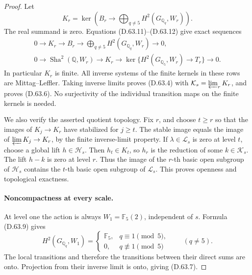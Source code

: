 \begin{proof}
Let
\[
 K_r=\ker\left(B_r\longrightarrow
                      \bigoplus_{q\ne5}H^2(G_{\mathbb Q_q},W_r)\right).
\]
The real summand is zero. Equations (D.63.11)--(D.63.12)
give exact sequences
\[
 \begin{gathered}
 0\longrightarrow K_r\longrightarrow B_r
   \longrightarrow\bigoplus_{q\ne5}H^2(G_{\mathbb Q_q},W_r)
   \longrightarrow0,\\
 0\longrightarrow\operatorname{Sha}^2(\mathbb Q,W_r)
   \longrightarrow K_r
   \longrightarrow
       \ker\{H^2(G_{\mathbb Q_5},W_r)\longrightarrow T_r\}
   \longrightarrow0.
 \end{gathered}                                          \tag{D.63.13}
\]
In particular \(K_r\) is finite. All inverse systems
of the finite kernels in these rows are Mittag--Leffler.
Taking inverse limits proves (D.63.4) with
\(\mathcal K_s=\varprojlim_rK_r\), and proves (D.63.6).
No surjectivity of the individual transition maps on
the finite kernels is needed.

We also verify the asserted quotient topology. Fix
\(r\), and choose \(t\ge r\) so that the images
of \(K_j\to K_r\) have stabilized for \(j\ge t\).
The stable image equals the image of
\(\varprojlim K_j\to K_r\), by the finite inverse-limit
property. If \(\lambda\in\mathcal L_s\) is zero at
level \(t\), choose a global lift \(h\in\mathcal H_s\).
Then \(h_t\in K_t\), so \(h_r\) is the reduction of
some \(k\in\mathcal K_s\). The lift \(h-k\) is zero
at level \(r\). Thus the image of the \(r\)-th basic
open subgroup of \(\mathcal H_s\) contains the
\(t\)-th basic open subgroup of \(\mathcal L_s\).
This proves openness and topological exactness.

\paragraph{Noncompactness at every scale.}
At level one the action is always
\(W_1=\mathbb F_5(2)\), independent of \(s\).
Formula (D.63.9) gives
\[
 H^2(G_{\mathbb Q_q},W_1)=
 \begin{cases}\mathbb F_5,&q\equiv1\pmod5,\\
 0,&q\not\equiv1\pmod5
 \end{cases}\qquad(q\ne5).
                                                        \tag{D.63.14}
\]
The local transitions and therefore the transitions
between their direct sums are onto. Projection from
their inverse limit is onto, giving (D.63.7).


\end{proof}
